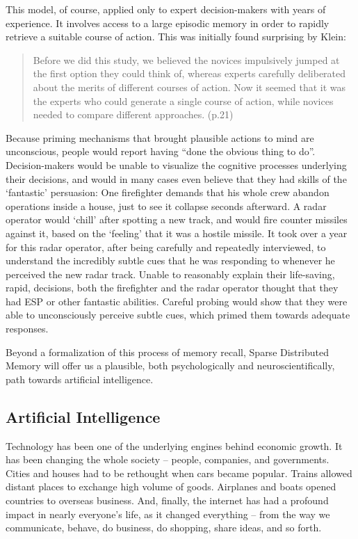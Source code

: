 This model, of course, applied only to expert decision-makers with years of experience.  It involves access to a large episodic memory in order to rapidly retrieve a suitable course of action.  This was initially found surprising by Klein:

\begin{quote}
	Before we did this study, we believed the novices impulsively jumped at the first option they could think of, whereas experts carefully deliberated about the merits of different courses of action.  Now it seemed that it was the experts who could generate a single course of action, while novices needed to compare different approaches. (p.21)
\end{quote}

Because priming mechanisms that brought plausible actions to mind are unconscious, people would report having ``done the obvious thing to do''.  Decision-makers would be unable to visualize the cognitive processes underlying their decisions, and would in many cases even believe that they had skills of the `fantastic' persuasion:  One firefighter demands that his whole crew abandon operations inside a house, just to see it collapse seconds afterward.  A radar operator would `chill' after spotting a new track, and would fire counter missiles against it, based on the `feeling' that it was a hostile missile.  It took over a year for this radar operator, after being carefully and repeatedly interviewed, to understand the incredibly subtle cues that he was responding to whenever he perceived the new radar track.  Unable to reasonably explain their life-saving, rapid, decisions, both the firefighter and the radar operator thought that they had ESP or other fantastic abilities. Careful probing would show that they were able to unconsciously perceive subtle cues, which primed them towards adequate responses.

Beyond a formalization of this process of memory recall, Sparse Distributed Memory will offer us a plausible, both psychologically and neuroscientifically, path towards artificial intelligence.

\subsection{Artificial Intelligence}


Technology has been one of the underlying engines behind economic growth. It has been changing the whole society -- people, companies, and governments. Cities and houses had to be rethought when cars became popular. Trains allowed distant places to exchange high volume of goods. Airplanes and boats opened countries to overseas business. And, finally, the internet has had a profound impact in nearly everyone's life, as it changed everything -- from the way we communicate, behave, do business, do shopping, share ideas, and so forth.

